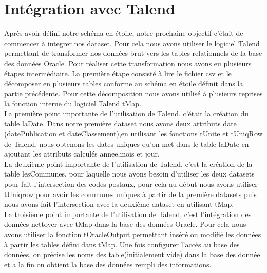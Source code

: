 \documentclass[a4paper,sffamily,12pt]{article}
\begin{document}
		\vspace{0.5cm}
				
	\section{Intégration avec Talend}

		\vspace{0.5cm}
		
		Après avoir défini notre schéma en étoile, notre prochaine objectif c'était de commencer à integrer nos dataset. Pour cela nous avons utiliser le logiciel Talend permettant de transformer nos données brut vers les tables relationnels de la base des données Oracle. Pour réaliser cette transformation nous avons eu plusieurs étapes intermédiaire. La première étape consisté à lire le fichier csv et le décomposer en plusieurs tables conforme au schéma en étoile définit dans la partie précédente. Pour cette décomposition nous avons utilisé à plusieurs reprises la fonction interne du logiciel Talend tMap. \\
		
    		La première point importante de l’utilisation de Talend, c’était la création du table laDate. Dans notre première dataset nous avons deux attributs date (datePublication et dateClassement),en utilisant les fonctions tUnite et tUniqRow de Talend, nous obtenons les dates uniques qu’on met dans le table laDate en ajoutant les attributs calculés annee,mois et jour. \\
    		La deuxième point importante de l’utilisation de Talend, c’est la création de la table lesCommunes, pour laquelle nous avons besoin d’utiliser les deux datasets pour fait l’intersection des codes postaux, pour cela au début nous avons utiliser tUniqrow pour avoir les communes uniques à partir de la première datasets puis nous avons fait l’intersection avec la deuxième dataset en utilisant tMap. \\
    		La troisième point importante de l’utilisation de Talend, c’est l’intégration des données nettoyer avec tMap dans la base des données Oracle. Pour cela nous avons utiliser la fonction tOracleOutput permettant inséré ou modifié les données à partir les tables défini dans tMap. Une fois configurer l’accès au base des données, on précise les noms des table(initialement vide) dans la base des donnée et a la fin on obtient la base des données rempli des informations. \\		
		
		\vspace{0.5cm}
			
\end{document}

